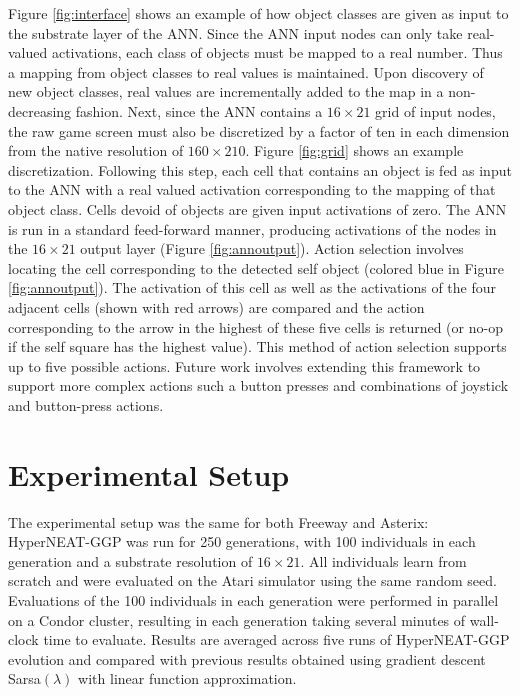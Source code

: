 \documentclass{sig-alternate}
\begin{document}
Figure \ref{fig:interface} shows an example of how object classes are given as input to the substrate layer of the ANN. Since the ANN input nodes can only take real-valued activations, each class of objects must be mapped to a real number. Thus a mapping from object classes to real values is maintained. Upon discovery of new object classes, real values are incrementally added to the map in a non-decreasing fashion. Next, since the ANN contains a $16\times 21$ grid of input nodes, the raw game screen must  also be discretized by a factor of ten in each dimension from the native resolution of $160\times 210$. Figure \ref{fig:grid} shows an example discretization. Following this step, each cell that contains an object is fed as input to the ANN with a real valued activation corresponding to the mapping of that object class. Cells devoid of objects are given input activations of zero. The ANN is run in a standard feed-forward manner, producing activations of the nodes in the $16\times 21$ output layer (Figure \ref{fig:annoutput}). Action selection involves locating the cell corresponding to the detected self object (colored blue in Figure \ref{fig:annoutput}). The activation of this cell as well as the activations of the four adjacent cells (shown with red arrows) are compared and the action corresponding to the arrow in the highest of these five cells is returned (or no-op if the self square has the highest value). This method of action selection supports up to five possible actions. Future work involves extending this framework to support more complex actions such a button presses and combinations of joystick and button-press actions.

\section{Experimental Setup}
\label{sec:experiments}
The experimental setup was the same for both Freeway and Asterix: HyperNEAT-GGP was run for 250 generations, with 100 individuals in each generation and a substrate resolution of $16\times 21$. All individuals learn from scratch and were evaluated on the Atari simulator using the same random seed. Evaluations of the 100 individuals in each generation were performed in parallel on a Condor cluster, resulting in each generation taking several minutes of wall-clock time to evaluate. Results are averaged across five runs of HyperNEAT-GGP evolution and compared with previous results obtained using gradient descent Sarsa$(\lambda)$ with linear function approximation\cite{naddaf10}. 
\end{document}
